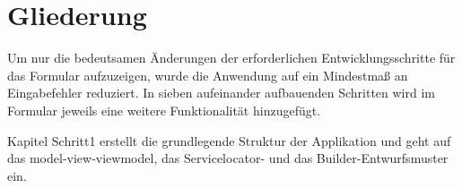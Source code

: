 
\section{Gliederung}

Um nur die bedeutsamen Änderungen der erforderlichen Entwicklungsschritte für das Formular aufzuzeigen,
wurde die Anwendung auf ein Mindestmaß an Eingabefehler reduziert.
In sieben aufeinander aufbauenden Schritten wird im Formular jeweils eine weitere Funktionalität hinzugefügt.

Kapitel Schritt1 erstellt die grundlegende Struktur der Applikation
und geht auf das model-view-viewmodel,
das Servicelocator-
und das Builder-Entwurfsmuster ein.

